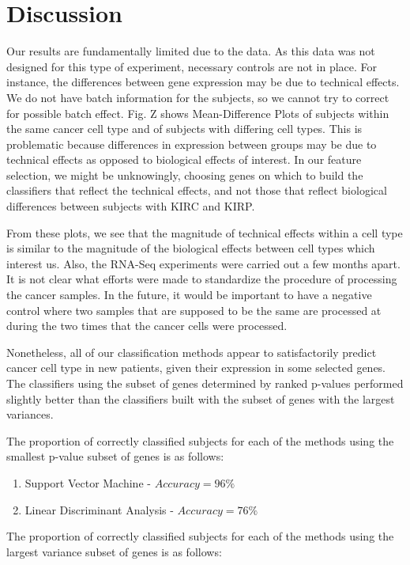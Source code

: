 \section{Discussion}

Our results are fundamentally limited due to the data. As this data was not
designed for this type of experiment, necessary controls are not in place. For
instance, the differences between gene expression may be due to technical
effects. We do not have batch information for the subjects, so we cannot try to
correct for possible batch effect. Fig. Z shows Mean-Difference Plots of
subjects within the same cancer cell type and of subjects with differing cell
types.  This is problematic because differences in expression between groups
may be due to technical effects as opposed to biological effects of interest.
In our feature selection, we might be unknowingly, choosing genes on which to
build the classifiers that reflect the technical effects, and not those that
reflect biological differences between subjects with KIRC and KIRP.

From these plots, we see that the magnitude of technical effects within a cell
type is similar to the magnitude of the biological effects between cell types
which interest us. Also, the RNA-Seq experiments were carried out a few months
apart. It is not clear what efforts were made to standardize the procedure of
processing the cancer samples. In the future, it would be important to have a
negative control where two samples that are supposed to be the same are
processed at during the two times that the cancer cells were processed. 

Nonetheless, all of our classification methods appear to satisfactorily predict
cancer cell type in new patients, given their expression in some selected
genes. The classifiers using the subset of genes determined by ranked p-values
performed slightly better than the classifiers built with the subset of genes
with the largest variances.

The proportion of correctly classified subjects for each of the methods using
the smallest p-value subset of genes is as follows:

\begin{enumerate}
\item Support Vector Machine - $Accuracy = 96\%$
\item Linear Discriminant Analysis - $Accuracy = 76\%$
\end{enumerate}

The proportion of correctly classified subjects for each of the methods using
the largest variance subset of genes is as follows:


